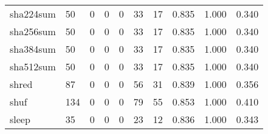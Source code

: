 \begin{longtable}{lp{2.0cm}p{2.0cm}p{2.0cm}p{2.0cm}p{2.0cm}p{2.0cm}p{2.0cm}p{2.0cm}p{2.0cm}}
sha224sum &                     50 &                                             0 &                                            0 &                                           0 &                                           33 &                                         17 &                                0.835 &                                  1.000 &                                0.340 \\
sha256sum &                     50 &                                             0 &                                            0 &                                           0 &                                           33 &                                         17 &                                0.835 &                                  1.000 &                                0.340 \\
sha384sum &                     50 &                                             0 &                                            0 &                                           0 &                                           33 &                                         17 &                                0.835 &                                  1.000 &                                0.340 \\
sha512sum &                     50 &                                             0 &                                            0 &                                           0 &                                           33 &                                         17 &                                0.835 &                                  1.000 &                                0.340 \\
shred     &                     87 &                                             0 &                                            0 &                                           0 &                                           56 &                                         31 &                                0.839 &                                  1.000 &                                0.356 \\
shuf      &                    134 &                                             0 &                                            0 &                                           0 &                                           79 &                                         55 &                                0.853 &                                  1.000 &                                0.410 \\
sleep     &                     35 &                                             0 &                                            0 &                                           0 &                                           23 &                                         12 &                                0.836 &                                  1.000 &                                0.343 \\

\end{longtable}
